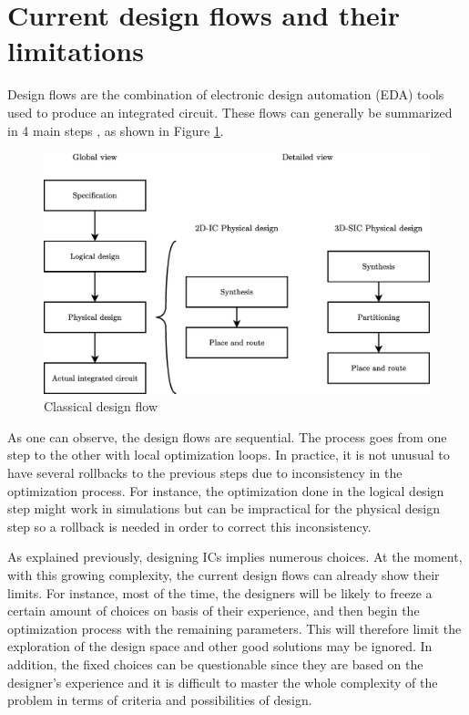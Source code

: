 \section{Current design flows and their limitations}
\label{sec:currentflows}

Design flows are the combination of electronic design automation (EDA) tools used to produce an integrated circuit. These flows can generally be summarized in 4 main steps \cite{coursefred}, as shown in Figure \ref{fig:designflow}.

\begin{figure}[h!]
\begin{center}
\includegraphics[width=\linewidth]{designflow2.eps}
\end{center}
\vspace{-0.5cm}
\caption{Classical design flow}
\label{fig:designflow}
\end{figure}

As one can observe, the design flows are sequential. The process goes from one step to the other with local optimization loops. In practice, it is not unusual to have several rollbacks to the previous steps due to inconsistency in the optimization process. For instance, the optimization done in the logical design step might work in simulations but can be impractical for the physical design step so a rollback is needed in order to correct this inconsistency.

As explained previously, designing ICs implies numerous choices. At the moment, with this growing complexity, the current design flows can already show their limits. For instance, most of the time, the designers will be likely to freeze a certain amount of choices on basis of their experience, and then begin the optimization process with the remaining parameters. This will therefore limit the exploration of the design space and other good solutions may be ignored. In addition, the fixed choices can be questionable since they are based on the designer's experience and it is difficult to master the whole complexity of the problem in terms of criteria and possibilities of design.

